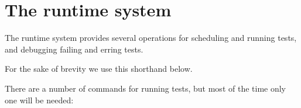 \section{The runtime system}
The runtime system provides several operations for scheduling and
running tests, and debugging failing and erring tests.
 
For the sake of brevity we use this shorthand below.



There are a number of commands for running tests, but most of the time
only one will be needed:




